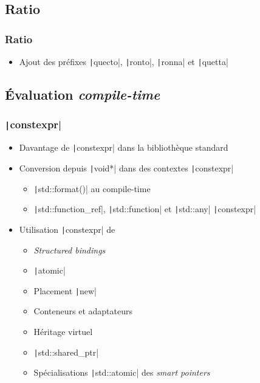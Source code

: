 \documentclass[C++.tex]{subfiles}
\begin{document}
\subsection*{Ratio}
\begin{frame}[fragile]
	\frametitle{Ratio}
	\begin{itemize}
		\item Ajout des préfixes \texttt|quecto|, \texttt|ronto|, \texttt|ronna| et \texttt|quetta|
	\end{itemize}

\end{frame}

\subsection*{Évaluation \textit{compile-time}}
\begin{frame}[fragile]
	\frametitle{\texttt|constexpr|}
	\begin{itemize}
		\item Davantage de \texttt|constexpr| dans la bibliothèque standard
		\item Conversion depuis \texttt|void*| dans des contextes \texttt|constexpr|
		\begin{itemize}
			\item \texttt|std::format()| au compile-time
			\item \texttt|std::function_ref|, \texttt|std::function| et \texttt|std::any| \texttt|constexpr|
		\end{itemize}
		\item Utilisation \texttt|constexpr| de
		\begin{itemize}
			\item \textit{Structured bindings}
			\item \texttt|atomic|
			\item Placement \texttt|new|
			\item Conteneurs et adaptateurs
			\item Héritage virtuel
			\item \texttt|std::shared_ptr|
			\item Spécialisations \texttt|std::atomic| des \textit{smart pointers}
		\end{itemize}
	\end{itemize}

\end{frame}
\end{document}
